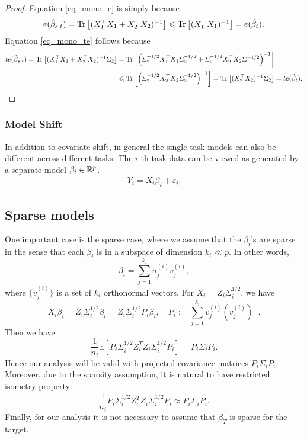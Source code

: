 \begin{proof}
	Equation \eqref{eq_mono_e} is simply because
		\[ e(\hat{\beta}_{s,t}) = \operatorname{Tr}\left[(X_1^{\top}X_1 + X_2^{\top}X_2)^{-1}\right] \leqslant \operatorname{Tr}\left[(X_1^{\top}X_1)^{-1}\right] = e(\hat{\beta}_t). \]
	Equation \eqref{eq_mono_te} follows because
	\begin{align*}
		te(\hat{\beta}_{s,t}) = \operatorname{Tr}\left[(X_1^{\top}X_1 + X_2^{\top}X_2)^{-1}\Sigma_2\right] &= \operatorname{Tr}\left[\left({\Sigma_2^{-1/2}X_1^{\top}X_1\Sigma_2^{-1/2} + \Sigma_2^{-1/2}X_2^{\top}X_2\Sigma^{-1/2}}\right)^{-1}\right] \\
		&\leqslant \operatorname{Tr}\left[\left({\Sigma_2^{-1/2}X_2^{\top}X_2\Sigma_2^{-1/2}}\right)^{-1}\right]
			= \operatorname{Tr}\left[(X_2^{\top}X_2)^{-1} \Sigma_2\right] = te(\hat{\beta}_t).
	\end{align*}
\end{proof}


\subsubsection{Model Shift}

In addition to covariate shift, in general the single-task models can also be different across different tasks.
The $i$-th task data can be viewed as generated by a separate model $\beta_i\in\mathbb{R}^p$.
\begin{align}
	Y_i = X_i \beta_i + \varepsilon_i.
\end{align}

\subsection{Sparse models}
One important case is the sparse case, where we assume that the $\beta_i$'s are sparse in the sense 
that each $\beta_i$ is in a subspace of dimension $k_i\ll p$. In other words,
$$\beta_i = \sum_{j=1}^{k_i} a^{(i)}_j v^{(i)}_j,$$
where $\{v^{(i)}_j\}$ is a set of $k_i$ orthonormal vectors. For $X_i= Z_i \Sigma_i^{1/2}$, we have 
$$ X_i \beta_i = Z_i \Sigma_i^{1/2}\beta_i=  Z_i \Sigma_i^{1/2}P_i\beta_i,\quad P_i:= \sum_{j=1}^{k_i}v_j^{(i)}(v_j^{(i)})^\top.$$
Then we have 
$$\frac{1}{n_i}\mathbb E\left[P_i \Sigma_i^{1/2} Z_i^T Z_i \Sigma_i^{1/2}P_i\right]=P_i \Sigma_i P_i.$$
Hence our analysis will be valid with projected covariance matrices $P_i \Sigma_i P_i$. Moreover, due to the sparsity assumption, it is natural to have restricted isometry property: 
$$\frac{1}{n_i} P_i \Sigma_i^{1/2} Z_i^T Z_i \Sigma_i^{1/2}P_i \approx P_i \Sigma_i P_i.$$
Finally, for our analysis it is not necessary to assume that $\beta_T$ is sparse for the target. 



